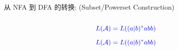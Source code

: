 \begin{frame}{}
\end{frame}

\begin{frame}{}
\end{frame}

\begin{frame}{}
\end{frame}

\begin{frame}{}
  \begin{center}
    从 NFA 到 DFA 的转换:  (Subset/Powerset Construction)

    \vspace{0.50cm}
    \begin{columns}
        \begin{center}
        \end{center}
        \begin{center}
        \end{center}
    \end{columns}
  \end{center}

  \vspace{0.20cm}
  \begin{center}
  \end{center}
\end{frame}

\begin{frame}{}
  \begin{center}

    \[
      \textcolor{blue}{L(\mathcal{A}) = L((a|b)^{\ast}abb)}
    \]
  \end{center}
\end{frame}

\begin{frame}{}
  \begin{center}
    \[
      \textcolor{blue}{L(\mathcal{A}) = L((a|b)^{\ast}abb)}
    \]
  \end{center}
\end{frame}

